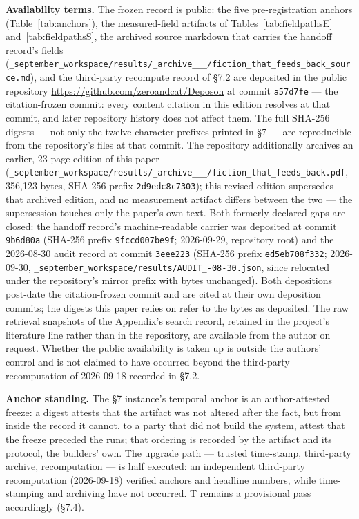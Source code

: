 \documentclass[11pt,a4paper]{article}
\begin{document}
\textbf{Availability terms.} The frozen record is public: the five pre-registration anchors (Table~\ref{tab:anchors}), the measured-field artifacts of Tables~\ref{tab:fieldpathsE} and~\ref{tab:fieldpathsS}, the archived source markdown that carries the handoff record's fields (\texttt{\_september\_\allowbreak workspace/\allowbreak results/\allowbreak \_archive\_\_\_/fiction\_\allowbreak that\_\allowbreak feeds\_\allowbreak back\_\allowbreak source.md}), and the third-party recompute record of §7.2 are deposited in the public repository \url{https://github.com/zeroandcat/Deposon} at commit \texttt{a57d7fe} — the citation-frozen commit: every content citation in this edition resolves at that commit, and later repository history does not affect them. The full SHA-256 digests — not only the twelve-character prefixes printed in §7 — are reproducible from the repository's files at that commit. The repository additionally archives an earlier, 23-page edition of this paper (\texttt{\_september\_\allowbreak workspace/\allowbreak results/\allowbreak \_archive\_\_\_/fiction\_\allowbreak that\_\allowbreak feeds\_\allowbreak back.pdf}, 356,123 bytes, SHA-256 prefix \texttt{2d9edc8c7303}); this revised edition supersedes that archived edition, and no measurement artifact differs between the two — the supersession touches only the paper's own text. Both formerly declared gaps are closed: the handoff record's machine-readable carrier was deposited at commit \texttt{9b6d80a} (SHA-256 prefix \texttt{9fccd007be9f}; 2026-09-29, repository root) and the 2026-08-30 audit record at commit \texttt{3eee223} (SHA-256 prefix \texttt{ed5eb708f332}; 2026-09-30, \texttt{\_september\_\allowbreak workspace/\allowbreak results/\allowbreak AUDIT\_-08-30.json}, since relocated under the repository's mirror prefix with bytes unchanged). Both depositions post-date the citation-frozen commit and are cited at their own deposition commits; the digests this paper relies on refer to the bytes as deposited. The raw retrieval snapshots of the Appendix's search record, retained in the project's literature line rather than in the repository, are available from the author on request. Whether the public availability is taken up is outside the authors' control and is not claimed to have occurred beyond the third-party recomputation of 2026-09-18 recorded in §7.2.

\textbf{Anchor standing.} The §7 instance's temporal anchor is an author-attested freeze: a digest attests that the artifact was not altered after the fact, but from inside the record it cannot, to a party that did not build the system, attest that the freeze preceded the runs; that ordering is recorded by the artifact and its protocol, the builders' own. The upgrade path — trusted time-stamp, third-party archive, recomputation — is half executed: an independent third-party recomputation (2026-09-18) verified anchors and headline numbers, while time-stamping and archiving have not occurred. T remains a provisional pass accordingly (§7.4).
\end{document}
